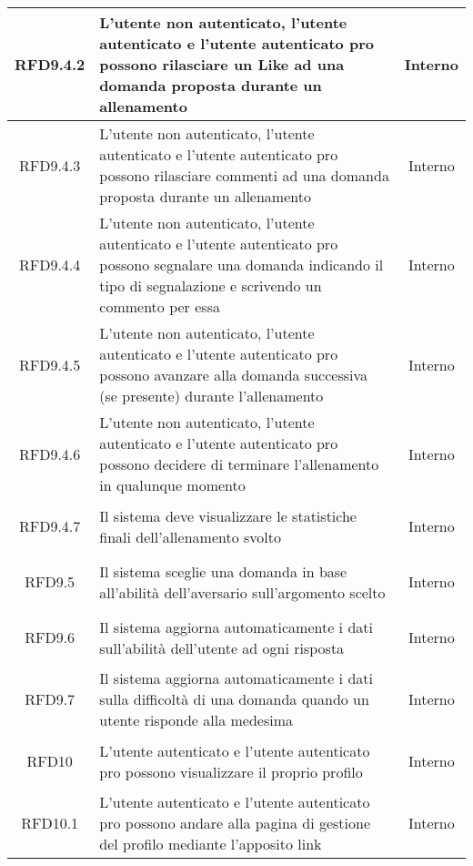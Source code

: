 \begin{longtable}{|c|>{\centering}m{7cm}|c|}
\hypertarget{RFD9.4.2}{RFD9.4.2} & L'utente non autenticato, l'utente autenticato e l'utente autenticato pro possono rilasciare un Like ad una domanda proposta durante un allenamento & Interno
\\ \hline

\hypertarget{RFD9.4.3}{RFD9.4.3} & L'utente non autenticato, l'utente autenticato e l'utente autenticato pro possono rilasciare commenti ad una domanda proposta durante un allenamento & Interno
\\ \hline

\hypertarget{RFD9.4.4}{RFD9.4.4} & L'utente non autenticato, l'utente autenticato e l'utente autenticato pro possono segnalare una domanda indicando il tipo di segnalazione e scrivendo un commento per essa & Interno
\\ \hline

\hypertarget{RFD9.4.5}{RFD9.4.5} & L'utente non autenticato, l'utente autenticato e l'utente autenticato pro possono avanzare alla domanda successiva (se presente) durante l'allenamento & Interno
\\ \hline

\hypertarget{RFD9.4.6}{RFD9.4.6} & L'utente non autenticato, l'utente autenticato e l'utente autenticato pro possono decidere di terminare l'allenamento in qualunque momento & Interno
\\ \hline

\hypertarget{RFD9.4.7}{RFD9.4.7} & Il sistema deve visualizzare le statistiche finali dell'allenamento svolto & Interno
\\ \hline

\hypertarget{RFD9.5}{RFD9.5} & Il sistema sceglie una domanda in base all'abilità dell'aversario sull'argomento scelto & Interno
\\ \hline

\hypertarget{RFD9.6}{RFD9.6} & Il sistema aggiorna automaticamente i dati sull'abilità dell'utente ad ogni risposta & Interno
\\ \hline

\hypertarget{RFD9.7}{RFD9.7} & Il sistema aggiorna automaticamente i dati sulla difficoltà di una domanda quando un utente risponde alla medesima & Interno
\\ \hline

\hypertarget{RFD10}{RFD10} & L’utente autenticato e l’utente autenticato pro possono visualizzare il proprio profilo & Interno
\\ \hline

\hypertarget{RFD10.1}{RFD10.1} & L’utente autenticato e l’utente autenticato pro possono andare alla pagina di gestione del profilo mediante l’apposito link & Interno
\\ \hline


\end{longtable}
